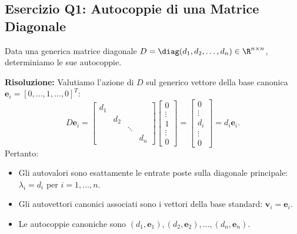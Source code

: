 \subsection{Esercizio Q1: Autocoppie di una Matrice Diagonale}

\begin{example}
\label{ex:q1-matrice-diagonale}
Data una generica matrice diagonale $D = \diag(d_1, d_2, \dots, d_n) \in \R^{n \times n}$, determiniamo le sue autocoppie.

\noindent\textbf{Risoluzione:}
Valutiamo l'azione di $D$ sul generico vettore della base canonica $\mathbf{e}_i = [0, \dots, 1, \dots, 0]^T$:
\begin{equation}
    D \mathbf{e}_i = \begin{bmatrix} d_1 & & & \\ & d_2 & & \\ & & \ddots & \\ & & & d_n \end{bmatrix} \begin{bmatrix} 0 \\ \vdots \\ 1 \\ \vdots \\ 0 \end{bmatrix} = \begin{bmatrix} 0 \\ \vdots \\ d_i \\ \vdots \\ 0 \end{bmatrix} = d_i \mathbf{e}_i.
\end{equation}
Pertanto:
\begin{itemize}
    \item Gli autovalori sono esattamente le entrate poste sulla diagonale principale: $\lambda_i = d_i$ per $i = 1, \dots, n$.
    \item Gli autovettori canonici associati sono i vettori della base standard: $\mathbf{v}_i = \mathbf{e}_i$.
    \item Le autocoppie canoniche sono $(d_1, \mathbf{e}_1), (d_2, \mathbf{e}_2), \dots, (d_n, \mathbf{e}_n)$.
\end{itemize}
\end{example}

